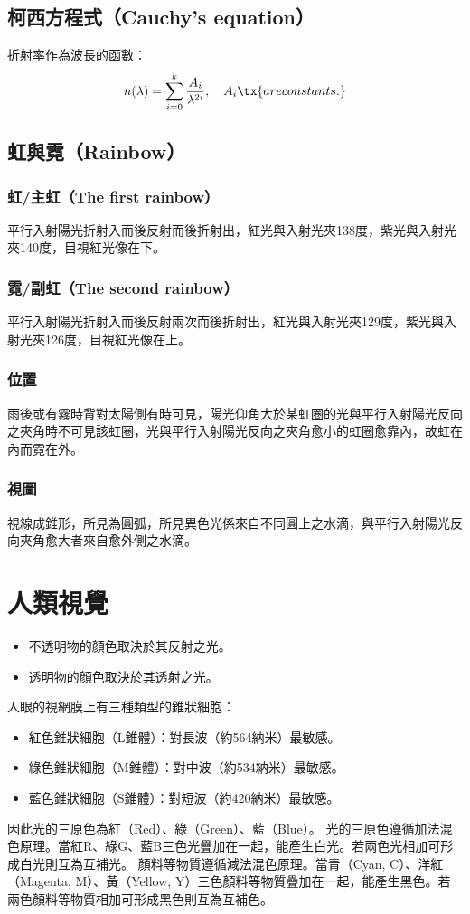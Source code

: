 \documentclass[a4paper,12pt]{report}
\begin{document}
\subsection{柯西方程式（Cauchy's equation）}
折射率作為波長的函數：
\[n(\lambda)=\sum_{i=0}^k\frac{A_i}{\lambda^{2i}}, \quad A_i \tx{ are constants.} \]
\subsection{虹與霓（Rainbow）}
\subsubsection{虹/主虹（The first rainbow）}
平行入射陽光折射入而後反射而後折射出，紅光與入射光夾138度，紫光與入射光夾140度，目視紅光像在下。
\subsubsection{霓/副虹（The second rainbow）}
平行入射陽光折射入而後反射兩次而後折射出，紅光與入射光夾129度，紫光與入射光夾126度，目視紅光像在上。
\subsubsection{位置}
雨後或有霧時背對太陽側有時可見，陽光仰角大於某虹圈的光與平行入射陽光反向之夾角時不可見該虹圈，光與平行入射陽光反向之夾角愈小的虹圈愈靠內，故虹在內而霓在外。
\subsubsection{視圖}
視線成錐形，所見為圓弧，所見異色光係來自不同圓上之水滴，與平行入射陽光反向夾角愈大者來自愈外側之水滴。


\section{人類視覺}
\begin{itemize}
\item 不透明物的顏色取決於其反射之光。
\item 透明物的顏色取決於其透射之光。
\end{itemize}
人眼的視網膜上有三種類型的錐狀細胞：
\begin{itemize}
\item 紅色錐狀細胞（L錐體）：對長波（約564納米）最敏感。
\item 綠色錐狀細胞（M錐體）：對中波（約534納米）最敏感。
\item 藍色錐狀細胞（S錐體）：對短波（約420納米）最敏感。
\end{itemize}
因此光的三原色為紅（Red）、綠（Green）、藍（Blue）。
光的三原色遵循加法混色原理。當紅R、綠G、藍B三色光疊加在一起，能產生白光。若兩色光相加可形成白光則互為互補光。
顏料等物質遵循減法混色原理。當青（Cyan, C）、洋紅（Magenta, M）、黃（Yellow, Y）三色顏料等物質疊加在一起，能產生黑色。若兩色顏料等物質相加可形成黑色則互為互補色。
\end{document}
